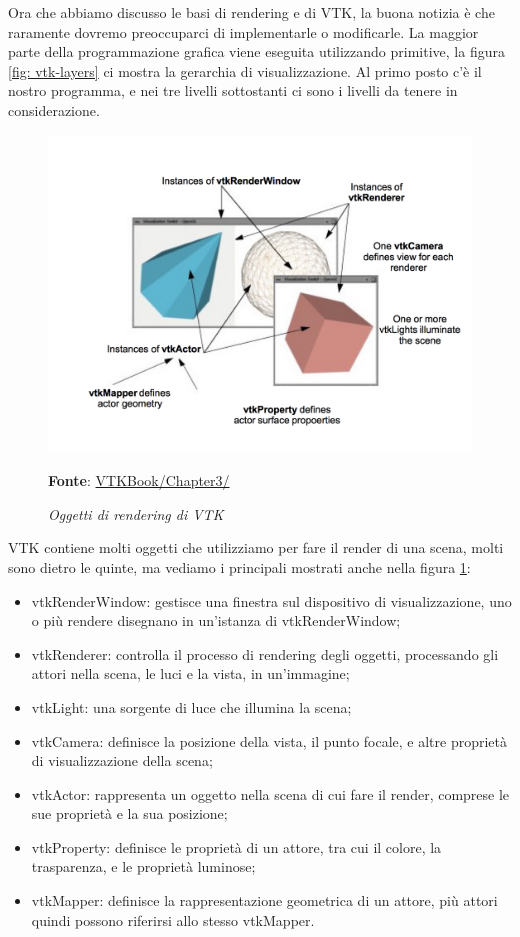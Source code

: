 Ora che abbiamo discusso le basi di rendering e di VTK, la buona notizia è che raramente dovremo preoccuparci di implementarle o modificarle. La maggior parte della programmazione grafica viene eseguita utilizzando primitive, la figura \ref{fig: vtk-layers} ci mostra la gerarchia di visualizzazione. Al primo posto c'è il nostro programma, e nei tre livelli sottostanti ci sono i livelli da tenere in considerazione.

\begin{figure}[h]
    \centering
    \includegraphics[scale=0.5]{immagini/volumerendering/vtkobjects.png}
    \caption{\textit{Oggetti di rendering di VTK}}
    \textbf{Fonte}: \href{https://lorensen.github.io/VTKExamples/site/VTKBook/03Chapter3/}{VTKBook/Chapter3/}
    \label{fig: Oggetti Rendering VTK}
\end{figure}

VTK contiene molti oggetti che utilizziamo per fare il render di una scena, molti sono dietro le quinte, ma vediamo i principali mostrati anche nella figura \ref{fig: Oggetti Rendering VTK}:
\begin{itemize}
\item vtkRenderWindow: gestisce una finestra sul dispositivo di visualizzazione, uno o più rendere disegnano in un'istanza di vtkRenderWindow;
\item vtkRenderer: controlla il processo di rendering degli oggetti, processando gli attori nella scena, le luci e la vista, in un'immagine;
\item vtkLight: una sorgente di luce che illumina la scena;
\item vtkCamera: definisce la posizione della vista, il punto focale, e altre proprietà di visualizzazione della scena;
\item vtkActor: rappresenta un oggetto nella scena di cui fare il render, comprese le sue proprietà e la sua posizione;
\item vtkProperty: definisce le proprietà di un attore, tra cui il colore, la trasparenza, e le proprietà luminose;  
\item vtkMapper: definisce la rappresentazione geometrica di un attore, più attori quindi possono riferirsi allo stesso vtkMapper.
\end{itemize}

